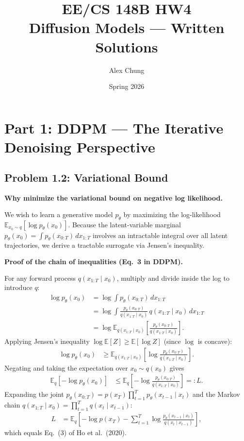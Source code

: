 \documentclass[11pt]{article}
\title{\textbf{EE/CS 148B HW4}\\\large Diffusion Models — Written Solutions}
\author{Alex Chung}
\date{Spring 2026}
\newcommand{\E}{\mathbb{E}}
\begin{document}
\maketitle

\tableofcontents
\newpage

\section{Part 1: DDPM — The Iterative Denoising Perspective}

\subsection{Problem 1.2: Variational Bound}

\textbf{Why minimize the variational bound on negative log likelihood.}

We wish to learn a generative model $p_\theta$ by maximizing the log-likelihood
$\E_{x_0 \sim q}[\log p_\theta(x_0)]$.  Because the latent-variable marginal
$p_\theta(x_0) = \int p_\theta(x_{0:T})\,dx_{1:T}$
involves an intractable integral over all latent trajectories, we derive a
tractable surrogate via Jensen's inequality.

\textbf{Proof of the chain of inequalities (Eq.~3 in DDPM).}

For any forward process $q(x_{1:T}\mid x_0)$, multiply and divide inside the
log to introduce $q$:
\begin{align*}
\log p_\theta(x_0)
&= \log \int p_\theta(x_{0:T})\,dx_{1:T}\\
&= \log \int \frac{p_\theta(x_{0:T})}{q(x_{1:T}\mid x_0)}\,
            q(x_{1:T}\mid x_0)\,dx_{1:T}\\
&= \log \E_{q(x_{1:T}\mid x_0)}\!\left[
      \frac{p_\theta(x_{0:T})}{q(x_{1:T}\mid x_0)}\right].
\end{align*}
Applying Jensen's inequality $\log\E[Z]\ge\E[\log Z]$ (since $\log$ is concave):
\begin{align*}
\log p_\theta(x_0)
&\ge \E_{q(x_{1:T}\mid x_0)}\!\left[
      \log\frac{p_\theta(x_{0:T})}{q(x_{1:T}\mid x_0)}\right].
\end{align*}
Negating and taking the expectation over $x_0\sim q(x_0)$ gives
\begin{align}
\E_q[-\log p_\theta(x_0)]
&\le \E_q\!\left[-\log\frac{p_\theta(x_{0:T})}{q(x_{1:T}\mid x_0)}\right]
 =: L. \label{eq:elbo}
\end{align}
Expanding the joint $p_\theta(x_{0:T})=p(x_T)\prod_{t=1}^{T}p_\theta(x_{t-1}\mid x_t)$
and the Markov chain $q(x_{1:T}\mid x_0)=\prod_{t=1}^{T}q(x_t\mid x_{t-1})$:
\begin{align*}
L &= \E_q\!\left[
      -\log p(x_T)
      - \sum_{t=1}^{T}\log\frac{p_\theta(x_{t-1}\mid x_t)}{q(x_t\mid x_{t-1})}
    \right],
\end{align*}
which equals Eq.~(3) of Ho et al.~(2020).
\end{document}
